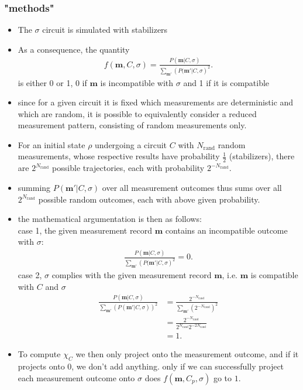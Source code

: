 \subsubsection{"methods"}
\begin{itemize} 
  \item The $\sigma$ circuit is simulated with stabilizers
  \item As a consequence, the quantity
      \begin{align}
      f(\mathbf{m},C, \sigma) = \frac{P(\mathbf{m} | C,
    \sigma)}{\sum_{\mathbf{m}'} \left(P(\mathbf{m}' | C, \sigma \right)^2} 
      .\end{align}
   is
    either 0 or 1, 0 if $\mathbf{m}$ is incompatible with $\sigma$ and 1 if it
    is compatible \item since for a given circuit it is fixed which
    measurements are deterministic and which are random, it is possible to
      equivalently consider a reduced measurement pattern, consisting of random
      measurements only.
    \item For an initial state $\rho$ undergoing a circuit $C$ with $N_\mathrm{rand}$ random measurements, whose
      respective results have probability $\frac{1}{2}$ (stabilizers), there are
      $2^{N_\mathrm{rand}}$ possible trajectories, each with probability
      $2^{-N_\mathrm{rand}}$.  \item summing $P(\mathbf{m}' | C, \sigma)$ over all
      measurement outcomes thus sums over all $2^{N_\mathrm{rand}}$ possible
      random outcomes, each with above given probability.  \item the mathematical
      argumentation is then as follows:\\
      case 1, the given measurement record $\mathbf{m}$ contains an
      incompatible outcome with $\sigma$:
      \begin{align} \frac{P(\mathbf{m} | C,
          \sigma)}{\sum_{\mathbf{m}'} \left(P(\mathbf{m}' | C, \sigma \right)^2} = 0
      .\end{align} 
      case 2, $\sigma$ complies with the given measurement record $\mathbf{m}$, i.e.
      $\mathbf{m}$ is compatible with $C$ and $\sigma$
        \begin{align} \frac{P(\mathbf{m} | C, \sigma)}{\sum_{\mathbf{m}'}
              \left(P(\mathbf{m}' | C, \sigma)\right)^2} &= \frac{
              2^{-N_\mathrm{rand}}}{\sum_{\mathbf{m}'}\left(2^{-N_\mathrm{rand}}\right)^2}
              \nonumber \\ &= \frac{2^{-N_\mathrm{rand}}}{2^{N_\mathrm{rand}}
          2^{-2N_\mathrm{rand}}} \nonumber\\ &= 1 
        .\end{align} 
    \item To compute $\chi_C$ we then only project onto the measurement outcome,
      and if it projects onto $0$, we don't add anything. only if we can
      successfully project each measurement outcome onto $\sigma$ does 
      $f(\mathbf{m},C_p, \sigma)$ go to $1$.


\end{itemize}
